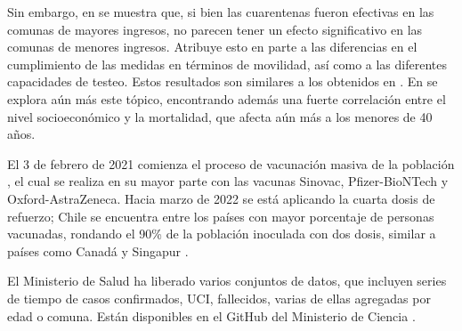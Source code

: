 Sin embargo, en \cite{Bennett2021} se muestra que, si bien las cuarentenas fueron efectivas en las comunas de mayores ingresos, no parecen tener un efecto significativo en las comunas de menores ingresos. Atribuye esto en parte a las diferencias en el cumplimiento de las medidas en términos de movilidad, así como a las diferentes capacidades de testeo. Estos resultados son similares a los obtenidos en \cite{Gozzi2021}. En \cite{Mena2021} se explora aún más este tópico, encontrando además una fuerte correlación entre el nivel socioeconómico y la mortalidad, que afecta aún más a los menores de 40 años.

El 3 de febrero de 2021 comienza el proceso de vacunación masiva de la población \cite{MINSAL2021}, el cual se realiza en su mayor parte con las vacunas Sinovac, Pfizer-BioNTech y Oxford-AstraZeneca. Hacia marzo de 2022 se está aplicando la cuarta dosis de refuerzo; Chile se encuentra entre los países con mayor porcentaje de personas vacunadas, rondando el 90\% de la población inoculada con dos dosis, similar a países como Canadá y Singapur \cite{Mathieu2021}.

El Ministerio de Salud ha liberado varios conjuntos de datos, que incluyen series de tiempo de casos confirmados, UCI, fallecidos, varias de ellas agregadas por edad o comuna. Están disponibles en el GitHub del Ministerio de Ciencia \cite{MINCIENCIA}. 
